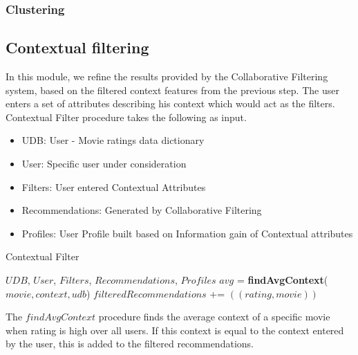 \documentclass{article}
\begin{document}
\subsubsection{Clustering}

\subsection{Contextual filtering}
In this module, we refine the results provided by the Collaborative Filtering system, based on the filtered context features from the previous step. The user enters a set of attributes describing his context which would act as the filters. Contextual Filter procedure takes the following as input.

\begin{itemize}
\item UDB: User - Movie ratings data dictionary
\item User: Specific user under consideration 
\item Filters: User entered Contextual Attributes	
\item Recommendations: Generated by Collaborative Filtering
\item Profiles: User Profile built based on Information gain of Contextual attributes
\end{itemize}

\begin{algorithm}[tb]
   \caption{Contextual Filter}
   \label{Contextual Filtering of Collaborative Filtering results}
\begin{algorithmic}
    $UDB$, $User$, $Filters$, $Recommendations$, $Profiles$
   \STATE $avg$ = {\bfseries findAvgContext}($movie, context, udb$)
   \STATE $filteredRecommendations$ += $((rating, movie))$
   \ENDIF   
   \ENDIF
   \ENDFOR
   \ENDIF
   \ENDFOR
\end{algorithmic}
\end{algorithm}

The $findAvgContext$ procedure finds the average context of a specific movie when rating is high over all users. If this context is equal to the context entered by the user, this is added to the filtered recommendations.

\end{document}

